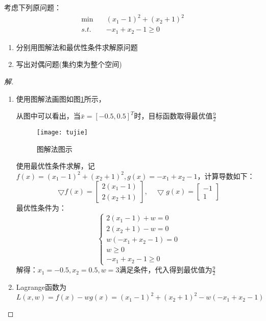 \documentclass[a4paper]{article}
\begin{document}
\section{}
考虑下列原问题：
\begin{equation}
\begin{aligned}
\min\quad&(x_1-1)^2+(x_2+1)^2 \\
s.t. \quad&-x_1+x_2-1\ge 0
\end{aligned}
\end{equation}
\begin{enumerate}
	\item 分别用图解法和最优性条件求解原问题
	\item 写出对偶问题(集约束为整个空间)
\end{enumerate}
\begin{proof}[解]
	\begin{enumerate}
		\item 
	使用图解法画图如图\ref{fig}所示，
	
	从图中可以看出，当$\bar{x}=[-0.5,0.5]^T$时，目标函数取得最优值$\frac{9}{2}$
	\begin{figure}[h!]
		\centering
		\texttt{[image: tujie]}
		\caption{\label{fig}图解法图示}
	\end{figure}
	
	使用最优性条件求解，记$f(x)=(x_1-1)^2+(x_2+1)^2,g(x)=-x_1+x_2-1$，计算导数如下：
	\begin{equation}
	\bigtriangledown f(x)=\left[
	\begin{array}{c}
	2(x_1-1) \\
	2(x_2+1)
	\end{array}
	\right],\quad\bigtriangledown g(x)=\left[
	\begin{array}{c}
	-1 \\
	1
	\end{array}
	\right]
	\end{equation}
    最优性条件为：
    \begin{equation}
    \left\{
    \begin{array}{c}
    2(x_1-1)+w=0 \\
    2(x_2+1)-w=0 \\
    w(-x_1+x_2-1)=0 \\
    w \ge 0 \\
    -x_1+x_2-1 \ge 0
    \end{array}
    \right.
    \end{equation}
    解得：$x_1=-0.5,x_2=0.5,w=3$满足条件，代入得到最优值为$\frac{9}{2}$
    \item Lagrange函数为$L(x,w)=f(x)-wg(x)=(x_1-1)^2+(x_2+1)^2-w(-x_1+x_2-1)$
    

\end{enumerate}
\end{proof}
\end{document}
